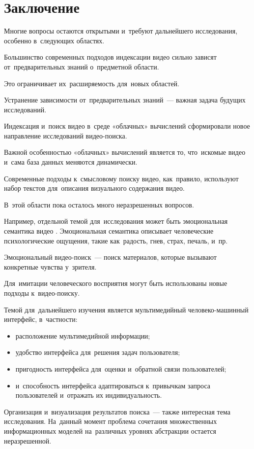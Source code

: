 
\section{Заключение}

Многие вопросы остаются открытыми и~требуют дальнейшего исследования, особенно в~следующих областях. 

Большинство современных подходов индексации видео сильно зависят от~предварительных знаний о~предметной области. 

Это ограничивает их~расширяемость для~новых областей. 

Устранение зависимости от~предварительных знаний~—
важная задача будущих исследований. 

Индексация и~поиск видео в~среде «облачных» вычислений сформировали новое направление исследований видео-поиска. 

Важной особенностью «облачных» вычислений является то, что~искомые видео и~сама база данных меняются динамически. 

Современные подходы к~смысловому поиску видео, как~правило, используют набор текстов для~описания визуального содержания видео. 

В~этой области пока осталось много неразрешенных вопросов. 

Например, отдельной темой для~исследования может быть эмоциональная семантика видео \cite{Tamizharasan:2013}.
Эмоциональная семантика описывает человеческие психологические ощущения, такие как~радость, гнев, страх, печаль, и~пр. 

Эмоциональный видео-поиск~— поиск материалов, которые вызывают конкретные чувства у~зрителя. 

Для~имитации человеческого восприятия могут быть использованы новые подходы к~видео-поиску. 

Темой для~дальнейшего изучения является мультимедийный человеко-машинный интерфейс, в~частности: 
\begin{itemize}
    \item расположение мультимедийной информации; 
    \item удобство интерфейса для~решения задач пользователя; 
    \item пригодность интерфейса для~оценки и~обратной связи пользователей; 
    \item и~способность интерфейса адаптироваться к~привычкам запроса пользователей
        и~отражать их индивидуальность. 
\end{itemize}

Организация и~визуализация результатов поиска~— также интересная тема исследования. На~данный момент проблема сочетания множественных информационных моделей на~различных уровнях абстракции остается неразрешенной. 

